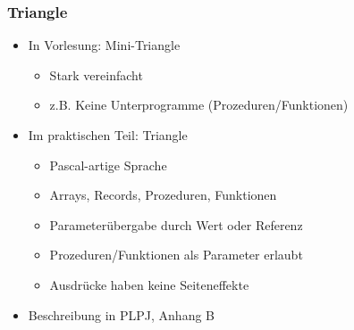 \subsubsection*{Triangle}
\begin{itemize}
	\item In Vorlesung: Mini-Triangle
	\begin{itemize}
		\item Stark vereinfacht
		\item z.B. Keine Unterprogramme (Prozeduren/Funktionen)
	\end{itemize}
	\item Im praktischen Teil: Triangle
	\begin{itemize}
		\item Pascal-artige Sprache
		\item Arrays, Records, Prozeduren, Funktionen
		\item Parameterübergabe durch Wert oder Referenz
		\item Prozeduren/Funktionen als Parameter erlaubt
		\item Ausdrücke haben keine Seiteneffekte 
	\end{itemize}
	\item Beschreibung in PLPJ, Anhang B
\end{itemize}